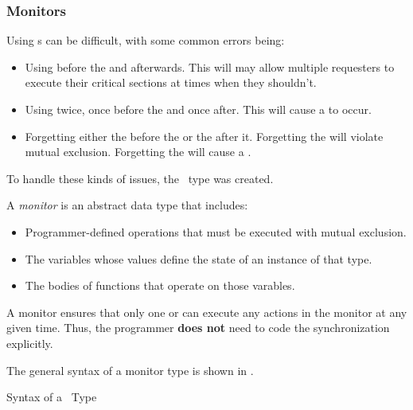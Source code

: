 \subsubsection{Monitors}\label{subsubsec:Monitors}
Using s can be difficult, with some common errors being:
\begin{itemize}[noitemsep]
\item Using  before the  and  afterwards.
  This will may allow multiple requesters to execute their critical sections at times when they shouldn't.
\item Using  twice, once before the  and once after.
  This will cause a  to occur.
\item Forgetting either the  before the  or the  after it.
  Forgetting the  will violate mutual exclusion.
  Forgetting the  will cause a .
\end{itemize}

To handle these kinds of issues, the ~type was created.

\begin{definition}[Monitor]\label{def:Monitor}
  A \emph{monitor} is an abstract data type that includes:
  \begin{itemize}[noitemsep]
  \item Programmer-defined operations that must be executed with mutual exclusion.
  \item The variables whose values define the state of an instance of that type.
  \item The bodies of functions that operate on those varables.
  \end{itemize}

  A monitor ensures that only one  or  can execute any actions in the monitor at any given time.
  Thus, the programmer \textbf{does not} need to code the synchronization explicitly.

  The general syntax of a monitor type is shown in .
\end{definition}

\begin{listing}[h!tbp]
\caption{Syntax of a ~Type}
\label{lst:Monitor_Type_Syntax}
\end{listing}

